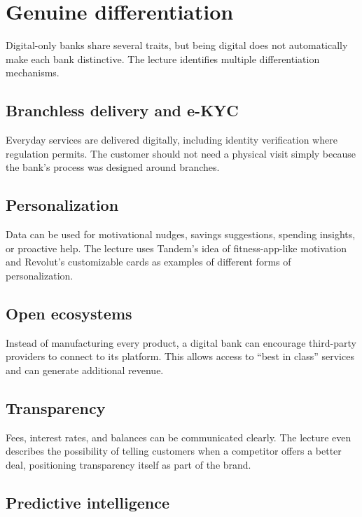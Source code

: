 \section{Genuine differentiation}

Digital-only banks share several traits, but being digital does not automatically make each bank distinctive. The lecture identifies multiple differentiation mechanisms.

\subsection{Branchless delivery and e-KYC}

Everyday services are delivered digitally, including identity verification where regulation permits. The customer should not need a physical visit simply because the bank's process was designed around branches.

\subsection{Personalization}

Data can be used for motivational nudges, savings suggestions, spending insights, or proactive help. The lecture uses Tandem's idea of fitness-app-like motivation and Revolut's customizable cards as examples of different forms of personalization.

\subsection{Open ecosystems}

Instead of manufacturing every product, a digital bank can encourage third-party providers to connect to its platform. This allows access to ``best in class'' services and can generate additional revenue.

\subsection{Transparency}

Fees, interest rates, and balances can be communicated clearly. The lecture even describes the possibility of telling customers when a competitor offers a better deal, positioning transparency itself as part of the brand.

\subsection{Predictive intelligence}

